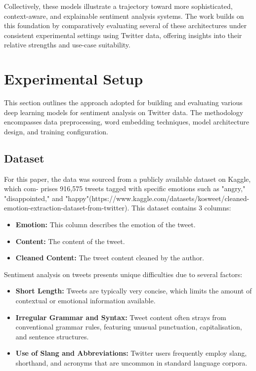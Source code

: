 \documentclass{article}
\begin{document}
Collectively, these models illustrate a trajectory toward more sophisticated, context-aware, and explainable sentiment analysis systems. The work builds on this foundation by comparatively evaluating several of these architectures under consistent experimental settings using Twitter data, offering insights into their relative strengths and use-case suitability.

\section{Experimental Setup}
This section outlines the approach adopted for building and evaluating various deep learning models for sentiment analysis on Twitter data. The methodology encompasses data preprocessing, word embedding techniques, model architecture design, and training configuration.

\subsection{Dataset}
For this paper, the data was sourced from a publicly available dataset on Kaggle, which com-
prises 916,575 tweets tagged with specific emotions such as "angry," "disappointed," and
"happy"(https://www.kaggle.com/datasets/kosweet/cleaned-emotion-extraction-dataset-from-twitter). This dataset contains 3 columns:
\begin{itemize}
\item \textbf{Emotion:} This column describes the emotion of the tweet.
\item \textbf{Content:} The content of the tweet.
\item \textbf{Cleaned Content:} The tweet content cleaned by the author.
\end{itemize}

Sentiment analysis on tweets presents unique difficulties due to several factors:
\begin{itemize}
\item \textbf{Short Length:} Tweets are typically very concise, which limits the amount of contextual or emotional information available.
\item \textbf{Irregular Grammar and Syntax:} Tweet content often strays from conventional grammar rules, featuring unusual punctuation, capitalisation, and sentence structures.
\item \textbf{Use of Slang and Abbreviations:} Twitter users frequently employ slang, shorthand, and acronyms that are uncommon in standard language corpora.
\end{itemize}
\end{document}
